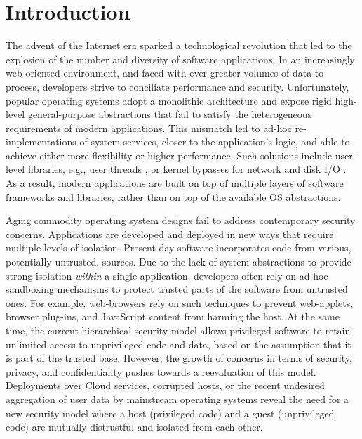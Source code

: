 \section{Introduction}

The advent of the Internet era sparked a technological revolution that led to the explosion of the number and diversity of software applications.
In an increasingly web-oriented environment, and faced with ever greater volumes of data to process, developers strive to conciliate performance and security.
Unfortunately, popular operating systems adopt a monolithic architecture and expose rigid high-level general-purpose abstractions that fail to satisfy the heterogeneous requirements of modern applications.
This mismatch led to ad-hoc re-implementations of system services, closer to the application's logic, and able to achieve either more flexibility or higher performance.
Such solutions include user-level libraries, e.g., user threads \cite{golang}, or kernel bypasses for network and disk I/O \cite{DBLP:conf/nsdi/NanavatiWW17,intel2014data,intel2016storage,BelayPKGKB14}.
As a result, modern applications are built on top of multiple layers of software frameworks and libraries, rather than on top of the available OS abstractions.

Aging commodity operating system designs fail to address contemporary security concerns.
Applications are developed and deployed in new ways that require multiple levels of isolation.
Present-day software incorporates code from various, potentially untrusted, sources.
Due to the lack of system abstractions to provide strong isolation \emph{within} a single application, developers often rely on ad-hoc sandboxing mechanisms to protect trusted parts of the software from untrusted ones.
For example, web-browsers rely on such techniques to prevent web-applets, browser plug-ins, and JavaScript content from harming the host.
At the same time, the current hierarchical security model allows privileged software to retain unlimited access to unprivileged code and data, based on the assumption that it is part of the trusted base.
However, the growth of concerns in terms of security, privacy, and confidentiality pushes towards a reevaluation of this model.
Deployments over Cloud services, corrupted hosts, or the recent undesired aggregation of user data by mainstream operating systems \cite{microsoftspy} reveal the need for a new security model where a host (privileged code) and a guest (unprivileged code) are mutually distrustful and isolated from each other.

